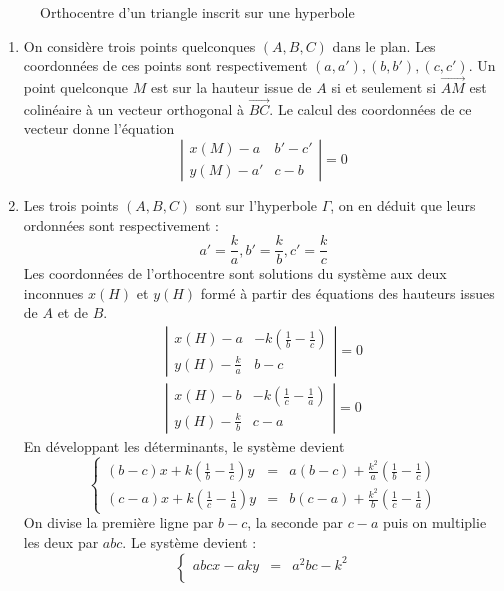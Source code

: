 \begin{figure}
   \centering
   
   \caption{Orthocentre d'un triangle inscrit sur une hyperbole}
   \label{fig:Corthoc_1}
\end{figure}

\begin{enumerate}
\item On considère trois points quelconques $(A,B,C)$ dans le plan. Les coordonnées de ces points sont respectivement $(a,a'), (b,b'), (c,c')$. Un point quelconque $M$ est sur la hauteur issue de $A$ si et seulement si $\overrightarrow{AM}$ est colinéaire à un vecteur orthogonal à $\overrightarrow{BC}$. Le calcul des coordonnées de ce vecteur donne l'équation
\[\left \vert
\begin{matrix}
x(M)-a & b'-c'\\
y(M)-a'& c-b
\end{matrix}
\right \vert
=0
\]
\item Les trois points $(A,B,C)$ sont sur l'hyperbole $\Gamma$, on en déduit que leurs ordonnées sont respectivement :
\[a'=\frac{k}{a},b'=\frac{k}{b},c'=\frac{k}{c}\]
Les coordonnées de l'orthocentre sont solutions du système aux deux inconnues $x(H)$ et $y(H)$ formé à partir des équations des hauteurs issues de $A$ et de $B$.
\begin{eqnarray*}
\left \vert
\begin{matrix}
x(H)-a & -k(\frac{1}{b}-\frac{1}{c})\\
y(H)-\frac{k}{a}& b-c
\end{matrix}
\right \vert
=0 \\
\left \vert
\begin{matrix}
x(H)-b & -k(\frac{1}{c}-\frac{1}{a})\\
y(H)-\frac{k}{b}& c-a
\end{matrix}
\right \vert
=0
\end{eqnarray*}
En développant les déterminants, le système devient
\[
\left\lbrace
\begin{matrix}
(b-c)x+k(\frac{1}{b}-\frac{1}{c})y &=& a(b-c)+\frac{k^2}{a}(\frac{1}{b}-\frac{1}{c}) \\
(c-a)x+k(\frac{1}{c}-\frac{1}{a})y &=& b(c-a)+\frac{k^2}{b}(\frac{1}{c}-\frac{1}{a})
\end{matrix}
\right.
\]
On divise la première ligne par $b-c$, la seconde par $c-a$ puis on multiplie les deux par $abc$. Le système devient :
\[
\left\lbrace
\begin{matrix}
abcx-aky &=& a^2bc-k^2 \\

\end{matrix}\]
\end{enumerate}
